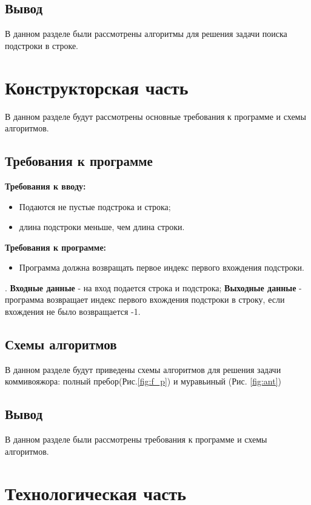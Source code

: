 \documentclass[12pt]{report}
\begin{document}
\section*{Вывод}
В данном разделе были рассмотрены алгоритмы для решения задачи поиска подстроки в строке. 


\chapter{Конструкторская часть}
В данном разделе будут рассмотрены основные требования к программе и схемы алгоритмов.

\section{Требования к программе}
\textbf{Требования к вводу:}
\begin{itemize}
	\item Подаются не пустые подстрока и строка;
	\item длина подстроки меньше, чем длина строки.
\end{itemize}

\textbf{Требования к программе:}
\begin{itemize}
	\item Программа должна возвращать первое индекс первого вхождения подстроки.
\end{itemize}
.  
\newline  
\textbf{Входные данные} - на вход подается строка и подстрока;
\newline
\textbf{Выходные данные} - программа возвращает индекс первого вхождения подстроки в строку, если вхождения не было возвращается -1.

\section{Схемы алгоритмов}
В данном разделе будут приведены схемы алгоритмов для решения задачи коммивояжора:
полный пребор(Рис.\ref{fig:f_p}) и муравьиный (Рис. \ref{fig:ant})\\
\newpage

\section*{Вывод}
В данном разделе были рассмотрены требования к программе и схемы алгоритмов.


\chapter{Технологическая часть}
\end{document}
